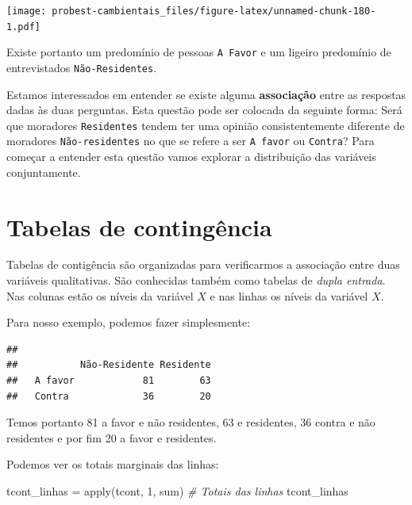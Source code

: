 \documentclass[
]{book}
\newenvironment{Shaded}{\begin{snugshade}}{\end{snugshade}}
\newcommand{\CommentTok}[1]{\textcolor[rgb]{0.56,0.35,0.01}{\textit{#1}}}
\newcommand{\DecValTok}[1]{\textcolor[rgb]{0.00,0.00,0.81}{#1}}
\newcommand{\FunctionTok}[1]{\textcolor[rgb]{0.00,0.00,0.00}{#1}}
\newcommand{\NormalTok}[1]{#1}
\newcommand{\OtherTok}[1]{\textcolor[rgb]{0.56,0.35,0.01}{#1}}
\newcommand{\SpecialCharTok}[1]{\textcolor[rgb]{0.00,0.00,0.00}{#1}}
\begin{document}
\texttt{[image: probest-cambientais\_files/figure-latex/unnamed-chunk-180-1.pdf]}

Existe portanto um predomínio de pessoas \texttt{A\ Favor} e um ligeiro predomínio de entrevistados \texttt{Não-Residentes}.

Estamos interessados em entender se existe alguma \textbf{associação} entre as respostas dadas às duas perguntas. Esta questão pode ser colocada da seguinte forma: Será que moradores \texttt{Residentes} tendem ter uma opinião consistentemente diferente de moradores \texttt{Não-residentes} no que se refere a ser \texttt{A\ favor} ou \texttt{Contra}? Para começar a entender esta questão vamos explorar a distribuição das variáveis conjuntamente.

\hypertarget{tabelas-de-continguxeancia}{%
\section{Tabelas de contingência}\label{tabelas-de-continguxeancia}}

Tabelas de contigência são organizadas para verificarmos a associação entre duas variáveis qualitativas. São conhecidas também como tabelas de \emph{dupla entrada}. Nas colunas estão os níveis da variável \(X\) e nas linhas os níveis da variável \(X\).

Para nosso exemplo, podemos fazer simplesmente:

\begin{Shaded}
\end{Shaded}

\begin{verbatim}
##          
##           Não-Residente Residente
##   A favor            81        63
##   Contra             36        20
\end{verbatim}

Temos portanto 81 a favor e não residentes, 63 e residentes, 36 contra e não residentes e por fim 20 a favor e residentes.

Podemos ver os totais marginais das linhas:

\begin{Shaded}
\begin{Highlighting}[]
\NormalTok{tcont\_linhas }\OtherTok{=} \FunctionTok{apply}\NormalTok{(tcont, }\DecValTok{1}\NormalTok{, sum) }\CommentTok{\# Totais das linhas}
\NormalTok{tcont\_linhas}
\end{Highlighting}
\end{Shaded}
\end{document}
